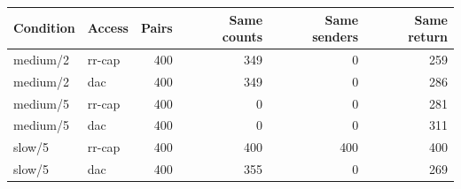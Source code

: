 \begin{tabular}{llrrrr}
\hline
Condition & Access & Pairs & Same counts & Same senders & Same return \\
\hline
medium/2 & rr-cap & 400 & 349 & 0 & 259 \\
medium/2 & dac & 400 & 349 & 0 & 286 \\
medium/5 & rr-cap & 400 & 0 & 0 & 281 \\
medium/5 & dac & 400 & 0 & 0 & 311 \\
slow/5 & rr-cap & 400 & 400 & 400 & 400 \\
slow/5 & dac & 400 & 355 & 0 & 269 \\
\hline
\end{tabular}
